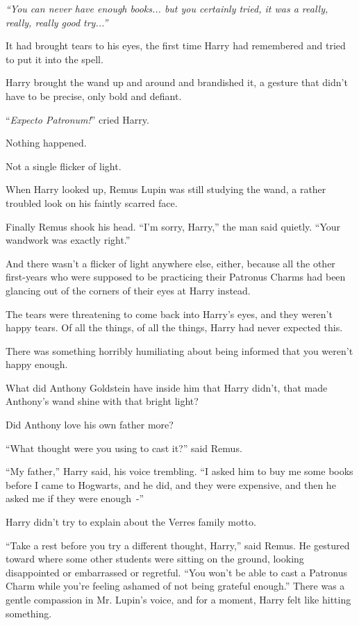 \emph{``You can never have enough books... but you certainly tried, it was a really, really, really good try...''}

It had brought tears to his eyes, the first time Harry had remembered and tried to put it into the spell.

Harry brought the wand up and around and brandished it, a gesture that didn't have to be precise, only bold and defiant.

``\emph{Expecto Patronum!}'' cried Harry.

Nothing happened.

Not a single flicker of light.

When Harry looked up, Remus Lupin was still studying the wand, a rather troubled look on his faintly scarred face.

Finally Remus shook his head. ``I'm sorry, Harry,'' the man said quietly. ``Your wandwork was exactly right.''

And there wasn't a flicker of light anywhere else, either, because all the other first-years who were supposed to be practicing their Patronus Charms had been glancing out of the corners of their eyes at Harry instead.

The tears were threatening to come back into Harry's eyes, and they weren't happy tears. Of all the things, of all the things, Harry had never expected this.

There was something horribly humiliating about being informed that you weren't happy enough.

What did Anthony Goldstein have inside him that Harry didn't, that made Anthony's wand shine with that bright light?

Did Anthony love his own father more?

``What thought were you using to cast it?'' said Remus.

``My father,'' Harry said, his voice trembling. ``I asked him to buy me some books before I came to Hogwarts, and he did, and they were expensive, and then he asked me if they were enough~-''

Harry didn't try to explain about the Verres family motto.

``Take a rest before you try a different thought, Harry,'' said Remus. He gestured toward where some other students were sitting on the ground, looking disappointed or embarrassed or regretful. ``You won't be able to cast a Patronus Charm while you're feeling ashamed of not being grateful enough.'' There was a gentle compassion in Mr. Lupin's voice, and for a moment, Harry felt like hitting something.

